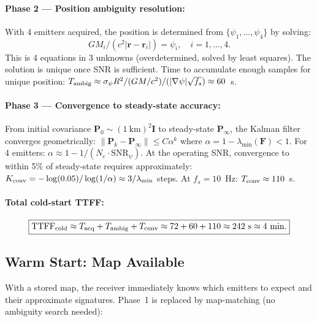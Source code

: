 \documentclass[aps,prd,twocolumn,superscriptaddress,nofootinbib]{revtex4-2}
\newcommand{\TTFF}{\mathrm{TTFF}}
\begin{document}
\paragraph{Phase 2 --- Position ambiguity resolution:}
With 4 emitters acquired, the position is determined from
$\{\psi_1,\ldots,\psi_4\}$ by solving:
\begin{equation}
  GM_i/(c^2|\mathbf{r} - \mathbf{r}_i|) = \psi_i, \quad i = 1,\ldots,4.
  \label{eq:position-system}
\end{equation}
This is 4 equations in 3 unknowns (overdetermined, solved by least squares).
The solution is unique once SNR is sufficient.  Time to accumulate
enough samples for unique position: $T_{\rm ambig} \approx
\sigma_\psi R^2/(GM/c^2) / (|\nabla\psi|\sqrt{f_s}) \approx 60$~s.

\paragraph{Phase 3 --- Convergence to steady-state accuracy:}
From initial covariance $\mathbf{P}_0 \sim (1~\mathrm{km})^2 \mathbf{I}$
to steady-state $\mathbf{P}_\infty$, the Kalman filter converges
geometrically: $\|\mathbf{P}_k - \mathbf{P}_\infty\| \leq C\alpha^k$
where $\alpha = 1 - \lambda_{\min}(\mathbf{F}) < 1$.  For 4 emitters:
$\alpha \approx 1 - 1/(N_e \cdot \mathrm{SNR}_\psi)$.  At the operating
SNR, convergence to within 5\% of steady-state requires approximately:
$K_{\rm conv} = -\log(0.05)/\log(1/\alpha) \approx 3/\lambda_{\min}$
steps.  At $f_s = 10$~Hz: $T_{\rm conv} \approx 110$~s.

\paragraph{Total cold-start TTFF:}
\begin{equation}
  \boxed{
  \TTFF_{\rm cold} \approx T_{\rm acq} + T_{\rm ambig} + T_{\rm conv}
  \approx 72 + 60 + 110 \approx 242~\mathrm{s} \approx 4~\mathrm{min}.
  }
  \label{eq:ttff-cold}
\end{equation}

\subsection{Warm Start: Map Available}

With a stored map, the receiver immediately knows which emitters to
expect and their approximate signatures.  Phase~1 is replaced by
map-matching (no ambiguity search needed):
\end{document}
